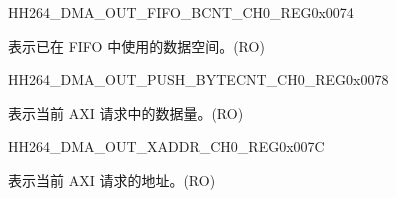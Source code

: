 \begin{register}{H}{H264\_DMA\_OUT\_FIFO\_BCNT\_CH0\_REG}{0x0074}\label{regdesc:H264DMAOUTFIFOBCNTCH0REG}
%
%
\regnewline%
\begin{regdesc}\begin{reglist}
\label{fielddesc:H264DMAOUTCMDFIFOOUTFIFOBCNTCH0}\item [H264\_DMA\_OUT\_CMDFIFO\_OUTFIFO\_BCNT\_CH0] 表示已在 FIFO 中使用的数据空间。(RO)
\end{reglist}\end{regdesc}
\end{register}


\begin{register}{H}{H264\_DMA\_OUT\_PUSH\_BYTECNT\_CH0\_REG}{0x0078}\label{regdesc:H264DMAOUTPUSHBYTECNTCH0REG}
%
%
\regnewline%
\begin{regdesc}\begin{reglist}
\label{fielddesc:H264DMAOUTCMDFIFOPUSHBYTECNTCH0}\item [H264\_DMA\_OUT\_CMDFIFO\_PUSH\_BYTECNT\_CH0] 表示当前 AXI 请求中的数据量。(RO)
\end{reglist}\end{regdesc}
\end{register}


\begin{register}{H}{H264\_DMA\_OUT\_XADDR\_CH0\_REG}{0x007C}\label{regdesc:H264DMAOUTXADDRCH0REG}
%
\regnewline%
\begin{regdesc}\begin{reglist}
\label{fielddesc:H264DMAOUTCMDFIFOXADDRCH0}\item [H264\_DMA\_OUT\_CMDFIFO\_XADDR\_CH0] 表示当前 AXI 请求的地址。(RO)
\end{reglist}\end{regdesc}
\end{register}


